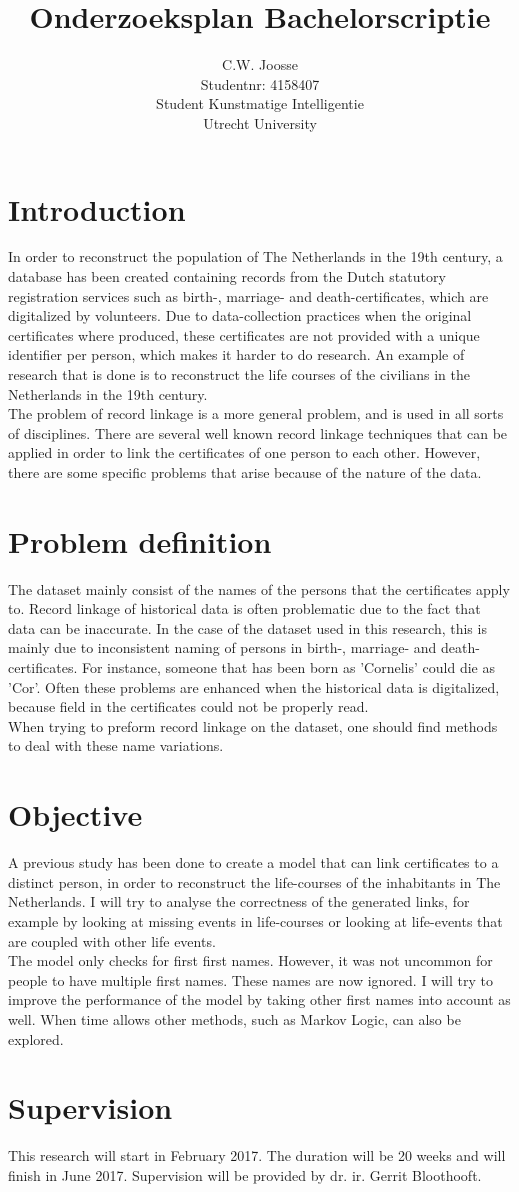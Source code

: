 \documentclass[a4paper, 11pt]{article}
\title{Onderzoeksplan Bachelorscriptie}
\author{C.W. Joosse \\ Studentnr: 4158407 \\ Student Kunstmatige Intelligentie \\ Utrecht University}
\begin{document}
\maketitle


\section{Introduction}
In order to reconstruct the population of The Netherlands in the 19th century, a database has been created containing records from the Dutch statutory registration services such as birth-, marriage- and death-certificates, which are digitalized by volunteers. Due to data-collection practices when the original certificates where produced, these certificates are not provided with a unique identifier per person, which makes it harder to do research. An example of research that is done is to reconstruct the life courses of the civilians in the Netherlands in the 19th century. \\
The problem of record linkage is a more general problem, and is used in all sorts of disciplines. There are several well known record linkage techniques that can be applied in order to link the certificates of one person to each other. However, there are some specific problems that arise because of the nature of the data.


\section{Problem definition}
The dataset mainly consist of the names of the persons that the certificates apply to. Record linkage of historical data is often problematic due to the fact that data can be inaccurate. In the case of the dataset used in this research, this is mainly due to inconsistent naming of persons in birth-, marriage- and death-certificates. For instance, someone that has been born as 'Cornelis' could die as 'Cor'. Often these problems are enhanced when the historical data is digitalized, because field in the certificates could not be properly read. \\
When trying to preform record linkage on the dataset, one should find methods to deal with these name variations. 

\section{Objective}
A previous study has been done to create a model that can link certificates to a distinct person, in order to reconstruct the life-courses of the inhabitants in The Netherlands. I will try to analyse the correctness of the generated links, for example by looking at missing events in life-courses or looking at life-events that are coupled with other life events. \\
The model only checks for first first names. However, it was not uncommon for people to have multiple first names. These names are now ignored. I will try to improve the performance of the model by taking other first names into account as well. 
When time allows other methods, such as Markov Logic, can also be explored.

\section{Supervision}
This research will start in February 2017. The duration will be 20 weeks and will finish in June 2017. Supervision will be provided by dr. ir. Gerrit Bloothooft.
\nocite{*}
\printbibliography
\end{document}
